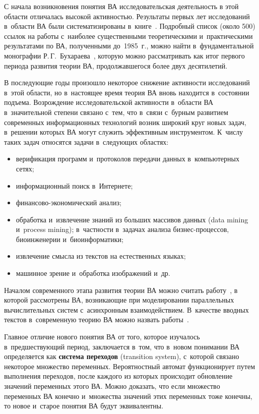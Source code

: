 \begin{multicols}{2}
С  начала возникновения  понятия  ВА исследовательская деятельность
в этой области отличалась высокой активностью. Результаты первых лет
исследований в~области ВА были сис\-те\-ма\-ти\-зи\-ро\-ва\-ны в~книге~\cite{7-mir}.
Подробный список  (около 500) ссылок на работы с~наиболее
существенными теоретическими и~практическими результатами по ВА,
полученными до~1985~г., можно найти в~фундаментальной монографии
Р.\,Г.~Бухараева~\cite{8-mir}, которую можно рассматривать как
итог первого периода развития теории ВА, продолжавшегося более двух
десятилетий.

В последующие годы произошло некоторое снижение
активности исследований в~этой области,
но в~настоящее время теория ВА
вновь находится в~состоянии подъема.
Возрождение исследовательской
активности в~области ВА в~значительной степени
связано с~тем, что в~связи с~бурным развитием современных информационных
технологий возник широкий круг новых задач, в~решении которых ВА могут служить
  эффективным инструментом. К~чис\-лу таких задач
  относятся задачи в~следующих областях:
\begin{itemize}
\item верификация программ и~протоколов передачи данных в~компьютерных сетях;
\item информационный поиск в~Интернете;
\item финансово-экономический анализ;
\item  обработка и~извлечение знаний из больших массивов данных
(data mining и~process mining);
 в~частности в~задачах анализа биз\-нес-\-про\-цес\-сов,
 биоинженерии и~биоинформатики;
\item  извлечение смысла из текстов на естественных языках;
\item  машинное зрение и~обработка
изображений   и~др.
\end{itemize}

Началом современного этапа развития
теории ВА можно считать работу~\cite{9-mir},
в которой рас\-смот\-ре\-ны ВА, возникающие при моделировании
параллельных вы\-чис\-ли\-тель\-ных сис\-тем с~асинхронным взаимодействием.
В~качестве вводных текстов в~современную теорию ВА можно назвать
работы~\cite{10-mir, 11-mir}.

Главное отличие нового понятия ВА от того, которое изучалось
в~предшествующий период, заключается в~том, что в~новом понимании ВА определяется
как \textbf{сис\-те\-ма переходов} ({transition system}),
с~которой связано некоторое множество переменных.
Вероятностный автомат
функционирует путем выполнения переходов, после каждого из которых
происходит обновление значений переменных этого ВА.
Можно доказать, что если множество переменных
ВА конечно и~множества значений этих переменных
тоже конечны, то новое и~старое понятия ВА будут эквивалентны.


\end{multicols}
